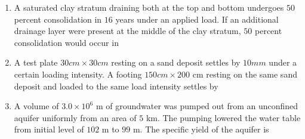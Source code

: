 \documentclass[journal]{IEEEtran}
\begin{document}
\begin{enumerate}
\begin{enumerate}
\end{enumerate}

\item A saturated clay stratum draining both at the top and bottom undergoes $50$ percent consolidation in $16$ years under an applied load. If an additional drainage layer were present at the middle of the clay stratum, $50$ percent consolidation would occur in \hfill {}

\begin{enumerate}
\end{enumerate}

\item A test plate $30 cm \times 30 cm$ resting on a sand deposit settles by $10 mm$ under a certain loading intensity. A footing $150 cm \times 200$ cm resting on the same sand deposit and loaded to the same load intensity settles by \hfill {}

\begin{enumerate}
\end{enumerate}

\item A volume of $3.0 \times 10^{6}$ m of groundwater was pumped out from an unconfined aquifer uniformly from an area of $5$ km. The pumping lowered the water table from initial level of $102$ m to $99$ m. The specific yield of the aquifer is \hfill {}

\begin{enumerate}
\end{enumerate}


\end{enumerate}
\end{document}

